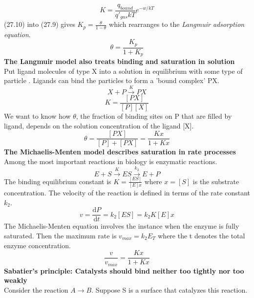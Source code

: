 \documentclass[8pt]{article}
\numberwithin{equation}{section}
\begin{document}
\begin{multicols}{2}
\begin{equation}
\end{equation}
\begin{equation}
K=\frac{q_{bound}}{q'_{gas}kT}e^{-w/kT} \tag{27.10}
\end{equation}
(27.10) into (27.9) gives $K_{p}=\frac{\theta}{1-\theta}$ which rearranges to the \textit{Langmuir adsorption equation}.
\begin{equation}
\theta=\frac{K_{p}}{1+K_{p}} \tag{27.12}
\end{equation}
\textbf{The Langmuir model also treats binding and saturation in solution} \\ 
Put ligand molecules of type X into a solution in equilibrium with some type of particle . Ligands can bind the particles to form a 'bound complex' PX.
\begin{equation}
X+P\xrightarrow{K}PX \tag{27.16}
\end{equation}
\begin{equation}
K=\frac{[PX]}{[P][X]} \tag{27.17}
\end{equation}
We want to know how $\theta$, the fraction of binding sites on P that are filled by ligand, depends on the solution concentration of the ligand [X].
\begin{equation}
\theta=\frac{[PX]}{[P]+[PX]}=\frac{Kx}{1+Kx} \tag{27.18}
\end{equation}
\textbf{The Michaelis-Menten model describes saturation in rate processes} \\
Among the most important reactions in biology is enzymatic reactions. 
\begin{equation}
E+S\xrightarrow{K}ES\xrightarrow{k_{2}}E+P \tag{27.23}
\end{equation}
The binding equilibrium constant is $K=\frac{[ES]}{[E]x}$ where $x=[S]$ is the substrate concentration. The velocity of the reaction is defined in terms of the rate constant $k_{2}$.
\begin{equation}
v=\frac{\mathrm{d}P}{\mathrm{d}t}=k_{2}[ES]=k_{2}K[E]x \tag{27.25}
\end{equation}
The Michaelis-Menten equation involves the instance when the enzyme is fully saturated. Then the maximum rate is $v_{max}=k_{2}E_{T}$ where the t denotes the total enzyme concentration. 
\begin{equation}
\frac{v}{v_{max}}=\frac{Kx}{1+Kx} \tag{27.28}
\end{equation} 
\textbf{Sabatier's principle: Catalysts should bind neither too tightly nor too weakly} \\
Consider the reaction $A\rightarrow B$. Suppose S is a surface that catalyzes this reaction. \begin{equation}

\end{equation}
\end{multicols}
\end{document}
